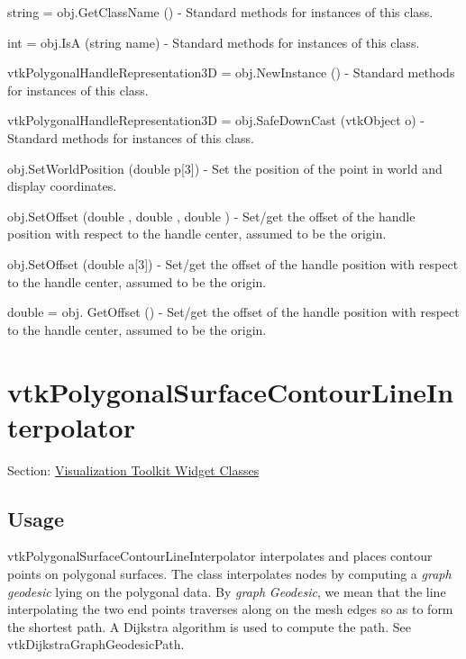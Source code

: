\begin{DoxyItemize}
\item {\ttfamily string = obj.\-Get\-Class\-Name ()} -\/ Standard methods for instances of this class.  
\item {\ttfamily int = obj.\-Is\-A (string name)} -\/ Standard methods for instances of this class.  
\item {\ttfamily vtk\-Polygonal\-Handle\-Representation3\-D = obj.\-New\-Instance ()} -\/ Standard methods for instances of this class.  
\item {\ttfamily vtk\-Polygonal\-Handle\-Representation3\-D = obj.\-Safe\-Down\-Cast (vtk\-Object o)} -\/ Standard methods for instances of this class.  
\item {\ttfamily obj.\-Set\-World\-Position (double p\mbox{[}3\mbox{]})} -\/ Set the position of the point in world and display coordinates.  
\item {\ttfamily obj.\-Set\-Offset (double , double , double )} -\/ Set/get the offset of the handle position with respect to the handle center, assumed to be the origin.  
\item {\ttfamily obj.\-Set\-Offset (double a\mbox{[}3\mbox{]})} -\/ Set/get the offset of the handle position with respect to the handle center, assumed to be the origin.  
\item {\ttfamily double = obj. Get\-Offset ()} -\/ Set/get the offset of the handle position with respect to the handle center, assumed to be the origin.  
\end{DoxyItemize}\hypertarget{vtkwidgets_vtkpolygonalsurfacecontourlineinterpolator}{}\section{vtk\-Polygonal\-Surface\-Contour\-Line\-Interpolator}\label{vtkwidgets_vtkpolygonalsurfacecontourlineinterpolator}
Section\-: \hyperlink{sec_vtkwidgets}{Visualization Toolkit Widget Classes} \hypertarget{vtkwidgets_vtkxyplotwidget_Usage}{}\subsection{Usage}\label{vtkwidgets_vtkxyplotwidget_Usage}
vtk\-Polygonal\-Surface\-Contour\-Line\-Interpolator interpolates and places contour points on polygonal surfaces. The class interpolates nodes by computing a {\itshape graph} {\itshape geodesic} lying on the polygonal data. By {\itshape graph} {\itshape Geodesic}, we mean that the line interpolating the two end points traverses along on the mesh edges so as to form the shortest path. A Dijkstra algorithm is used to compute the path. See vtk\-Dijkstra\-Graph\-Geodesic\-Path.

